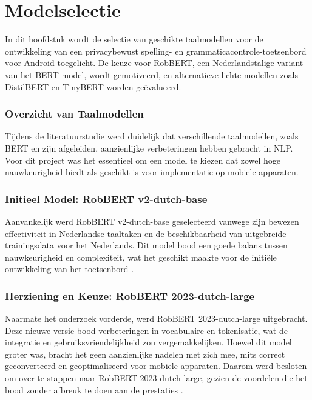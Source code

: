 \chapter{Modelselectie}
\label{ch:modelselectie}

In dit hoofdstuk wordt de selectie van geschikte taalmodellen voor de ontwikkeling van een privacybewust spelling- en grammaticacontrole-toetsenbord voor Android toegelicht. De keuze voor RobBERT, een Nederlandstalige variant van het BERT-model, wordt gemotiveerd, en alternatieve lichte modellen zoals DistilBERT en TinyBERT worden geëvalueerd.

\subsection{Overzicht van Taalmodellen}

Tijdens de literatuurstudie werd duidelijk dat verschillende taalmodellen, zoals BERT en zijn afgeleiden, aanzienlijke verbeteringen hebben gebracht in NLP. Voor dit project was het essentieel om een model te kiezen dat zowel hoge nauwkeurigheid biedt als geschikt is voor implementatie op mobiele apparaten.

\subsection{Initieel Model: RobBERT v2-dutch-base}

Aanvankelijk werd RobBERT v2-dutch-base geselecteerd vanwege zijn bewezen effectiviteit in Nederlandse taaltaken en de beschikbaarheid van uitgebreide trainingsdata voor het Nederlands. Dit model bood een goede balans tussen nauwkeurigheid en complexiteit, wat het geschikt maakte voor de initiële ontwikkeling van het toetsenbord \autocite{Delobelle2020}.

\subsection{Herziening en Keuze: RobBERT 2023-dutch-large}

Naarmate het onderzoek vorderde, werd RobBERT 2023-dutch-large uitgebracht. Deze nieuwe versie bood verbeteringen in vocabulaire en tokenisatie, wat de integratie en gebruiksvriendelijkheid zou vergemakkelijken. Hoewel dit model groter was, bracht het geen aanzienlijke nadelen met zich mee, mits correct geconverteerd en geoptimaliseerd voor mobiele apparaten. Daarom werd besloten om over te stappen naar RobBERT 2023-dutch-large, gezien de voordelen die het bood zonder afbreuk te doen aan de prestaties \autocite{Delobelle2023}.

